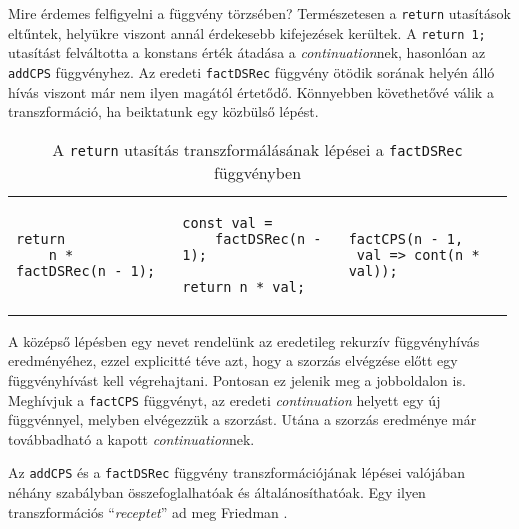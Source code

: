 Mire érdemes felfigyelni a függvény törzsében? Természetesen a \texttt{return} utasítások eltűntek, helyükre viszont annál érdekesebb kifejezések kerültek. A \texttt{return 1;} utasítást felváltotta a konstans érték átadása a \textit{continuation}nek, hasonlóan az \texttt{addCPS} függvényhez. Az eredeti \texttt{factDSRec} függvény ötödik sorának helyén álló hívás viszont már nem ilyen magától értetődő. Könnyebben követhetővé válik a transzformáció, ha beiktatunk egy közbülső lépést.

\lstset{language=JavaScript, numbers=none, breaklines=true}

\begin{table}[h]
\captionsetup{justification=centering}
\centering
\begin{tabular}{p{0.33\linewidth} | p{0.33\linewidth} | p{0.33\linewidth}}
\begin{lstlisting}
return
    n * factDSRec(n - 1);
\end{lstlisting}&
\begin{lstlisting}
const val =
    factDSRec(n - 1);

return n * val;
\end{lstlisting}&
\begin{lstlisting}
factCPS(n - 1, 
 val => cont(n * val));
\end{lstlisting} 
\end{tabular}
\caption{A \texttt{return} utasítás transzformálásának lépései a \texttt{factDSRec} függvényben}  
\label{table:steps}
\end{table}


A középső lépésben egy nevet rendelünk az eredetileg rekurzív függvényhívás eredményéhez, ezzel explicitté téve azt, hogy a szorzás elvégzése előtt egy függvényhívást kell végrehajtani. Pontosan ez jelenik meg a jobboldalon is. Meghívjuk a \texttt{factCPS} függvényt, az eredeti \textit{continuation} helyett egy új függvénnyel, melyben elvégezzük a szorzást. Utána a szorzás eredménye már továbbadható a kapott \textit{continuation}nek.

Az \texttt{addCPS} és a \texttt{factDSRec} függvény transzformációjának lépései valójában néhány szabályban összefoglalhatóak és általánosíthatóak. Egy ilyen transzformációs ``\textit{receptet}'' ad meg Friedman \citeyear{EssProgLan}.

